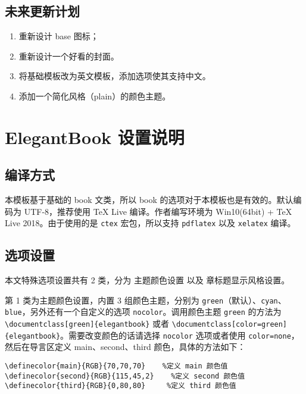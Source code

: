 \documentclass{elegantbook}
\begin{document}
\section{未来更新计划}


\begin{enumerate}[noitemsep]
   \item 重新设计 base 图标；
   \item 重新设计一个好看的封面。
   \item 将基础模板改为英文模板，添加选项使其支持中文。
   \item 添加一个简化风格（plain）的颜色主题。
\end{enumerate}

\chapter{ElegantBook 设置说明}


\section{编译方式}

本模板基于基础的 book 文类，所以 book 的选项对于本模板也是有效的。默认编码为 UTF-8，推荐使用 \TeX{} Live 编译。作者编写环境为 Win10(64bit) + \TeX{} Live 2018。由于使用的是 \texttt{ctex} 宏包，所以支持 \texttt{pdflatex} 以及 \texttt{xelatex} 编译。


\section{选项设置}
本文特殊选项设置共有 2 类，分为 {\color{main}主题颜色}设置 以及 {\color{main}章标题显示风格}设置。

第 1 类为{\color{main}主题颜色}设置，内置 3 组颜色主题，分别为 \verb|green|（默认）、\verb|cyan|、\verb|blue|，另外还有一个自定义的选项  \verb|nocolor|。调用颜色主题 \verb|green| 的方法为 \\
\verb|\documentclass[green]{elegantbook}| 或者 \verb|\documentclass[color=green]{elegantbook}|。需要改变颜色的话请选择 \verb|nocolor| 选项或者使用 \verb|color=none|，然后在导言区定义 main、second、third 颜色，具体的方法如下：

\begin{verbatim}
\definecolor{main}{RGB}{70,70,70}    %定义 main 颜色值
\definecolor{second}{RGB}{115,45,2}    %定义 second 颜色值
\definecolor{third}{RGB}{0,80,80}     %定义 third 颜色值
\end{verbatim}
\end{document}

